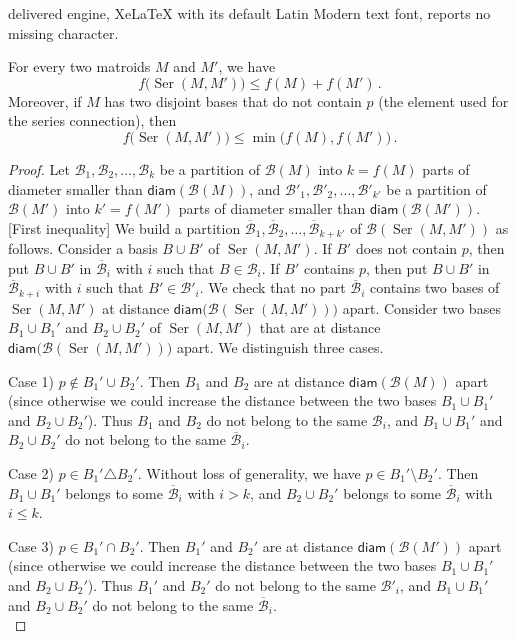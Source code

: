 \documentclass[10pt,a4paper]{amsart}
\def \B {\mathcal{B}}
\newcommand{\Ser}{\operatorname{Ser}}
\newcommand{\diame}{\mathsf{diam}}
\renewcommand{\leq}{\leqslant}
\begin{document}
delivered engine, XeLaTeX with its default Latin Modern text font, reports no missing character.
\begin{proposition}\label{prop:ser}
For every two matroids $M$ and $M'$, we have \[
f\bigl(\Ser(M,M')\bigr) \leq f(M) + f(M') \, .
\] Moreover, if $M$ has two disjoint bases that do not contain $p$ (the element used for the series connection), then
\[
f\bigl(\Ser(M,M')\bigr) \leq \min\bigl(f(M),f(M')\bigr) \, .
\]
\end{proposition}

\begin{proof}
Let $\B_1,\B_2,\ldots,\B_k$ be a partition of $\B(M)$ into $k=f(M)$ parts of diameter smaller than $\diame(\B(M))$, and $\B'_1,\B'_2,\ldots,\B'_{k'}$ be a partition of $\B(M')$ into $k'=f(M')$ parts of diameter smaller than $\diame(\B(M'))$. \\


[First inequality] We build a partition $\overline{\B}_1,\overline{\B}_2,\ldots,\overline{\B}_{k+k'}$ of $\B(\Ser(M,M'))$ as follows. Consider a basis $B \cup B'$ of $\Ser(M,M')$. If $B'$ does not contain $p$, then put $B \cup B'$ in $\overline{\B}_i$ with $i$ such that $B \in \B_i$. If $B'$ contains $p$, then put $B \cup B'$ in $\overline{\B}_{k+i}$ with $i$ such that $B' \in \B'_i$. We check that no part $\overline{\B}_i$ contains two bases of $\Ser(M,M')$ at distance $\diame\bigl(\B(\Ser(M,M'))\bigr)$ apart. Consider two bases $B_1 \cup B_1'$ and $B_2 \cup B_2'$ of $\Ser(M,M')$ that are at distance $\diame\bigl(\B(\Ser(M,M'))\bigr)$ apart. We distinguish three cases.

Case 1) $p \notin B_1' \cup B_2'$. Then $B_1$ and $B_2$ are at distance $\diame(\B(M))$ apart (since otherwise we could increase the distance between the two bases $B_1 \cup B_1'$ and $B_2 \cup B_2'$). Thus $B_1$ and $B_2$ do not belong to the same $\B_i$, and $B_1 \cup B_1'$ and $B_2 \cup B_2'$ do not belong to the same $\overline{\B}_i$.

Case 2) $p \in B_1' \triangle B_2'$. Without loss of generality, we have $p \in B_1' \setminus B_2'$. Then $B_1 \cup B_1'$ belongs to some $\overline{\B}_i$ with $i > k$, and $B_2 \cup B_2'$ belongs to some $\overline{\B}_i$ with $i \leq k$.

Case 3) $p \in B_1' \cap B_2'$. Then $B_1'$ and $B_2'$ are at distance $\diame(\B(M'))$ apart (since otherwise we could increase the distance between the two bases $B_1 \cup B_1'$ and $B_2 \cup B_2'$). Thus $B_1'$ and $B_2'$ do not belong to the same $\B'_i$, and $B_1 \cup B_1'$ and $B_2 \cup B_2'$ do not belong to the same $\overline{\B}_i$.\\


\end{proof}
\end{document}
